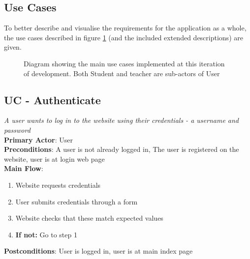 \documentclass[a4paper,11pt]{report}
\begin{document}
\subsection{Use Cases}
To better describe and visualise the requirements for the application as a whole, the use cases described in figure \ref{fig:uc} (and the included extended descriptions) are given.
\begin{figure}[ht]
\centering
{}
\label{fig:uc}
\caption{Diagram showing the main use cases implemented at this iteration of development. Both Student and teacher are sub-actors of User}
\end{figure}

\singlespacing
\subsection*{UC - Authenticate}
\textit{A user wants to log in to the website using their credentials - a username and password}\\
\textbf{Primary Actor}: User\\
\textbf{Preconditions}: A user is not already logged in, The user is registered on the website, user is at login web page\\
\textbf{Main Flow}:
\begin{enumerate}
\item Website requests credentials
\item User submits credentials through a form
\item Website checks that these match expected values
\item \textbf{If not:} Go to step 1
\end{enumerate}
\textbf{Postconditions}: User is logged in, user is at main index page
\end{document}
